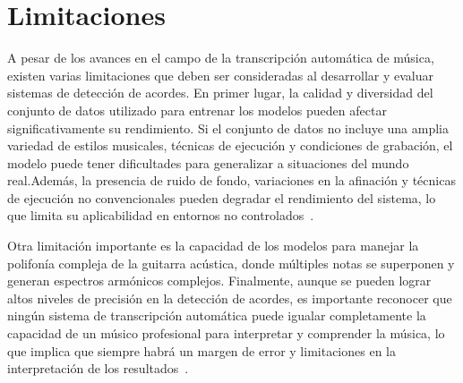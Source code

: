 \section{Limitaciones}
A pesar de los avances en el campo de la transcripción automática de música, existen varias limitaciones que deben ser consideradas al desarrollar y evaluar sistemas de detección de acordes. En primer lugar, la calidad y diversidad del conjunto de datos utilizado para entrenar los modelos pueden afectar significativamente su rendimiento. Si el conjunto de datos no incluye una amplia variedad de estilos musicales, técnicas de ejecución y condiciones de grabación, el modelo puede tener dificultades para generalizar a situaciones del mundo real.Además, la presencia de ruido de fondo, variaciones en la afinación y técnicas de ejecución no convencionales pueden degradar el rendimiento del sistema, lo que limita su aplicabilidad en entornos no controlados~\cite{benetos2019automatic}. 

Otra limitación importante es la capacidad de los modelos para manejar la polifonía compleja de la guitarra acústica, donde múltiples notas se superponen y generan espectros armónicos complejos. Finalmente, aunque se pueden lograr altos niveles de precisión en la detección de acordes, es importante reconocer que ningún sistema de transcripción automática puede igualar completamente la capacidad de un músico profesional para interpretar y comprender la música, lo que implica que siempre habrá un margen de error y limitaciones en la interpretación de los resultados~\cite{jamshidi2024machine}.